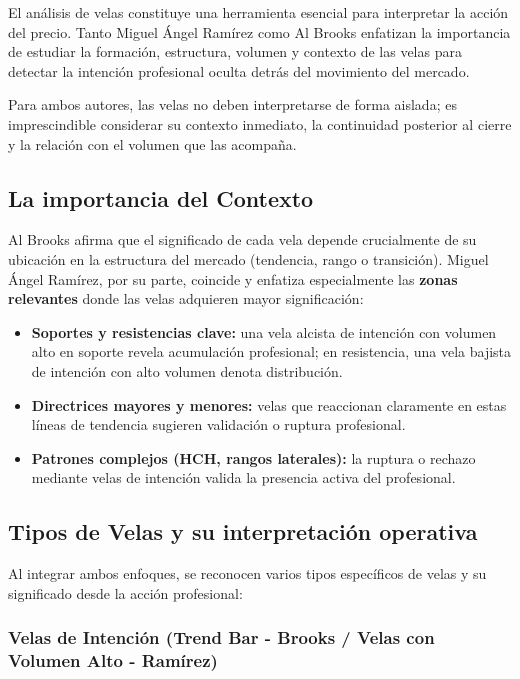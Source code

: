 El an\'alisis de velas constituye una herramienta esencial para interpretar la acci\'on del precio. Tanto Miguel \'Angel Ram\'irez como Al Brooks enfatizan la importancia de estudiar la formaci\'on, estructura, volumen y contexto de las velas para detectar la intenci\'on profesional oculta detr\'as del movimiento del mercado.

Para ambos autores, las velas no deben interpretarse de forma aislada; es imprescindible considerar su contexto inmediato, la continuidad posterior al cierre y la relaci\'on con el volumen que las acompa\~na.

\subsection{La importancia del Contexto}

Al Brooks afirma que el significado de cada vela depende crucialmente de su ubicaci\'on en la estructura del mercado (tendencia, rango o transici\'on). Miguel \'Angel Ram\'irez, por su parte, coincide y enfatiza especialmente las \textbf{zonas relevantes} donde las velas adquieren mayor significaci\'on:

\begin{itemize}
    \item \textbf{Soportes y resistencias clave:} una vela alcista de intenci\'on con volumen alto en soporte revela acumulaci\'on profesional; en resistencia, una vela bajista de intenci\'on con alto volumen denota distribuci\'on.
    \item \textbf{Directrices mayores y menores:} velas que reaccionan claramente en estas l\'ineas de tendencia sugieren validaci\'on o ruptura profesional.
    \item \textbf{Patrones complejos (HCH, rangos laterales):} la ruptura o rechazo mediante velas de intenci\'on valida la presencia activa del profesional.
\end{itemize}

\subsection{Tipos de Velas y su interpretaci\'on operativa}

Al integrar ambos enfoques, se reconocen varios tipos espec\'ificos de velas y su significado desde la acci\'on profesional:

\subsubsection{Velas de Intenci\'on (Trend Bar - Brooks / Velas con Volumen Alto - Ram\'irez)}


